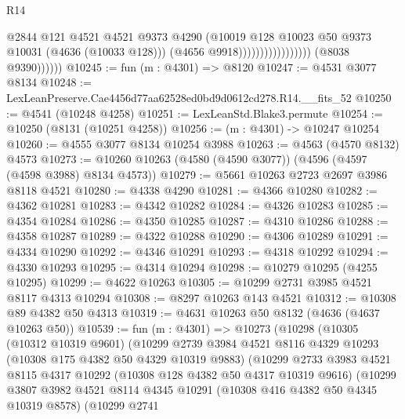 \begin{lexlean}{R14}
\begin{coremodule}
                                              @2844
                                              @121
                                              @4521
                                              @4521
                                              @9373
                                              @4290
                                              (@10019
                                                @128
                                                @10023
                                                @50
                                                @9373
                                                @10031
                                                (@4636 (@10033 @128)))
                                              (@4656 @9918)))))))))))))))))
              (@8038 @9390))))))
@10245 := fun (m : @4301) => @8120
@10247 := @4531 @3077 @8134
@10248 := LexLeanPreserve.Cae4456d77aa62528ed0bd9d0612cd278.R14.__fits_52
@10250 := @4541 (@10248 @4258)
@10251 := LexLeanStd.Blake3.permute
@10254 := @10250 (@8131 (@10251 @4258))
@10256 := (m : @4301) -> @10247 @10254
@10260 := @4555 @3077 @8134 @10254 @3988
@10263 := @4563 (@4570 @8132) @4573
@10273 := @10260 @10263 (@4580 (@4590 @3077)) (@4596 (@4597 (@4598 @3988) @8134 @4573))
@10279 := @5661 @10263 @2723 @2697 @3986 @8118 @4521
@10280 := @4338 @4290
@10281 := @4366 @10280
@10282 := @4362 @10281
@10283 := @4342 @10282
@10284 := @4326 @10283
@10285 := @4354 @10284
@10286 := @4350 @10285
@10287 := @4310 @10286
@10288 := @4358 @10287
@10289 := @4322 @10288
@10290 := @4306 @10289
@10291 := @4334 @10290
@10292 := @4346 @10291
@10293 := @4318 @10292
@10294 := @4330 @10293
@10295 := @4314 @10294
@10298 := @10279 @10295 (@4255 @10295)
@10299 := @4622 @10263
@10305 := @10299 @2731 @3985 @4521 @8117 @4313 @10294
@10308 := @8297 @10263 @143 @4521
@10312 := @10308 @89 @4382 @50 @4313
@10319 := @4631 @10263 @50 @8132 (@4636 (@4637 @10263 @50))
@10539 := fun (m : @4301) =>
  @10273
    (@10298
      (@10305
        (@10312 @10319 @9601)
        (@10299
          @2739
          @3984
          @4521
          @8116
          @4329
          @10293
          (@10308 @175 @4382 @50 @4329 @10319 @9883)
          (@10299
            @2733
            @3983
            @4521
            @8115
            @4317
            @10292
            (@10308 @128 @4382 @50 @4317 @10319 @9616)
            (@10299
              @3807
              @3982
              @4521
              @8114
              @4345
              @10291
              (@10308 @416 @4382 @50 @4345 @10319 @8578)
              (@10299
                @2741

\end{coremodule}
\end{lexlean}
